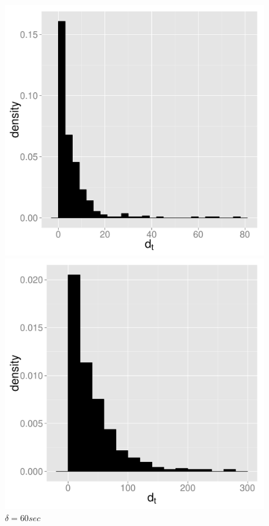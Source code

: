 \documentclass{wscpaperproc}
\theoremstyle{wsc}
\begin{document}
\begin{figure}[h]
\begin{minipage}[c]{.3\textwidth}
\end{minipage}

\begin{minipage}[c]{.3\textwidth}
\centering
    \includegraphics[scale=0.25]{40sec.pdf}
    \caption*{$\delta=40 sec$}

\end{minipage}
\hspace*{\fill} %
\begin{minipage}[c]{.3\textwidth}
\centering
    \includegraphics[scale=0.25]{60sec.pdf}
    \caption*{$\delta=60 sec$}


\end{minipage}
\end{figure}
\end{document}
